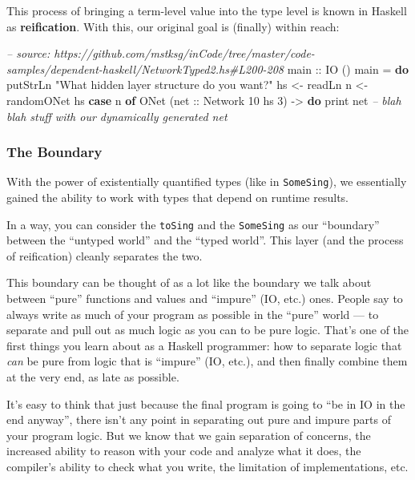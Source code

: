 \documentclass[]{article}
\newenvironment{Shaded}{}{}
\newcommand{\KeywordTok}[1]{\textcolor[rgb]{0.00,0.44,0.13}{\textbf{{#1}}}}
\newcommand{\DataTypeTok}[1]{\textcolor[rgb]{0.56,0.13,0.00}{{#1}}}
\newcommand{\DecValTok}[1]{\textcolor[rgb]{0.25,0.63,0.44}{{#1}}}
\newcommand{\StringTok}[1]{\textcolor[rgb]{0.25,0.44,0.63}{{#1}}}
\newcommand{\CommentTok}[1]{\textcolor[rgb]{0.38,0.63,0.69}{\textit{{#1}}}}
\newcommand{\OtherTok}[1]{\textcolor[rgb]{0.00,0.44,0.13}{{#1}}}
\newcommand{\FunctionTok}[1]{\textcolor[rgb]{0.02,0.16,0.49}{{#1}}}
\newcommand{\NormalTok}[1]{{#1}}
\begin{document}
This process of bringing a term-level value into the type level is known in
Haskell as \textbf{reification}. With this, our original goal is (finally)
within reach:

\begin{Shaded}
\begin{Highlighting}[]
\CommentTok{-- source: https://github.com/mstksg/inCode/tree/master/code-samples/dependent-haskell/NetworkTyped2.hs#L200-208}
\OtherTok{main ::} \DataTypeTok{IO} \NormalTok{()}
\NormalTok{main }\FunctionTok{=} \KeywordTok{do}
    \NormalTok{putStrLn }\StringTok{"What hidden layer structure do you want?"}
    \NormalTok{hs }\OtherTok{<-} \NormalTok{readLn}
    \NormalTok{n  }\OtherTok{<-} \NormalTok{randomONet hs}
    \KeywordTok{case} \NormalTok{n }\KeywordTok{of}
      \DataTypeTok{ONet} \NormalTok{(}\OtherTok{net ::} \DataTypeTok{Network} \DecValTok{10} \NormalTok{hs }\DecValTok{3}\NormalTok{) }\OtherTok{->} \KeywordTok{do}
        \NormalTok{print net}
        \CommentTok{-- blah blah stuff with our dynamically generated net}
\end{Highlighting}
\end{Shaded}

\subsubsection{The Boundary}\label{the-boundary}

With the power of existentially quantified types (like in \texttt{SomeSing}), we
essentially gained the ability to work with types that depend on runtime
results.

In a way, you can consider the \texttt{toSing} and the \texttt{SomeSing} as our
``boundary'' between the ``untyped world'' and the ``typed world''. This layer
(and the process of reification) cleanly separates the two.

This boundary can be thought of as a lot like the boundary we talk about between
``pure'' functions and values and ``impure'' (IO, etc.) ones. People say to
always write as much of your program as possible in the ``pure'' world --- to
separate and pull out as much logic as you can to be pure logic. That's one of
the first things you learn about as a Haskell programmer: how to separate logic
that \emph{can} be pure from logic that is ``impure'' (IO, etc.), and then
finally combine them at the very end, as late as possible.

It's easy to think that just because the final program is going to ``be in IO in
the end anyway'', there isn't any point in separating out pure and impure parts
of your program logic. But we know that we gain separation of concerns, the
increased ability to reason with your code and analyze what it does, the
compiler's ability to check what you write, the limitation of implementations,
etc.
\end{document}
